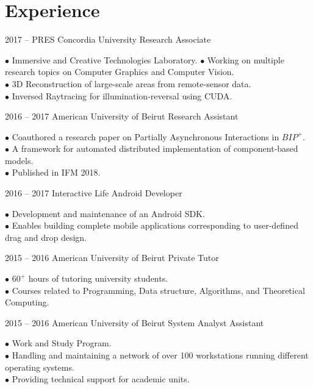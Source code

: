 \documentclass{tccv}
\begin{document}
\section{Experience}
\begin{eventlist}

\item{2017 -- PRES}
     {Concordia University}
     {Research Associate}

$\bullet$ Immersive and Creative Technologies Laboratory.
$\bullet$ Working on multiple research topics on Computer Graphics and Computer Vision.\\
$\bullet$ 3D Reconstruction of large-scale areas from remote-sensor data.\\
$\bullet$ Inversed Raytracing for illumination-reversal using CUDA.



\item{2016 -- 2017}
     {American University of Beirut}
     {Research Assistant}

$\bullet$ Coauthored a research paper on Partially Asynchronous Interactions in $BIP^+$.\\
$\bullet$ A framework for automated distributed implementation of component-based models. \\
$\bullet$ Published in IFM 2018.

\item{2016 -- 2017}
     {Interactive Life}
     {Android Developer}

$\bullet$ Development and maintenance of an Android SDK.\\
$\bullet$ Enables building complete mobile applications corresponding to user-defined drag and drop design.

\item{2015 -- 2016}
     {American University of Beirut}
     {Private Tutor}

$\bullet$ $60^+$ hours of tutoring university students.\\
$\bullet$ Courses related to Programming, Data structure, Algorithms, and Theoretical Computing.

\item{2015 -- 2016}
     {American University of Beirut}
     {System Analyst Assistant}

$\bullet$ Work and Study Program.\\
$\bullet$ Handling and maintaining a network of over 100 workstations running different operating systems. \\
$\bullet$ Providing technical support for academic units.


\end{eventlist}
\end{document}
